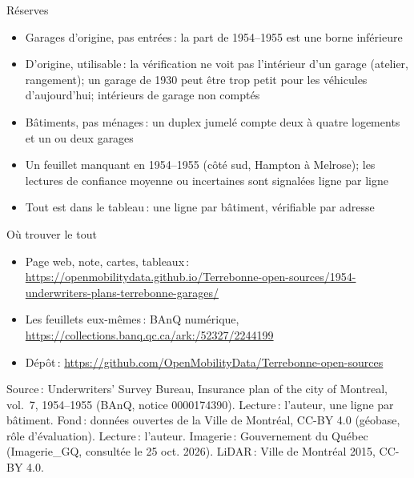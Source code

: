 \documentclass[aspectratio=169,11pt]{beamer}
\begin{document}
\begin{frame}{Réserves}\begin{itemize}\item Garages d'origine, pas entrées\,: la part de 1954--1955 est une borne inférieure
\item D'origine, utilisable\,: la vérification ne voit pas l'intérieur d'un garage (atelier, rangement); un garage de 1930 peut être trop petit pour les véhicules d'aujourd'hui; intérieurs de garage non comptés
\item Bâtiments, pas ménages\,: un duplex jumelé compte deux à quatre logements et un ou deux garages
\item Un feuillet manquant en 1954--1955 (côté sud, Hampton à Melrose); les lectures de confiance moyenne ou incertaines sont signalées ligne par ligne
\item Tout est dans le tableau\,: une ligne par bâtiment, vérifiable par adresse\end{itemize}\end{frame}
\begin{frame}{Où trouver le tout}\begin{itemize}\item Page web, note, cartes, tableaux\,: \url{https://openmobilitydata.github.io/Terrebonne-open-sources/1954-underwriters-plans-terrebonne-garages/}
\item Les feuillets eux-mêmes\,: BAnQ numérique, \url{https://collections.banq.qc.ca/ark:/52327/2244199}
\item Dépôt\,: \url{https://github.com/OpenMobilityData/Terrebonne-open-sources}\end{itemize}\vfill{\tiny Source\,: Underwriters' Survey Bureau, Insurance plan of the city of Montreal, vol.~7, 1954--1955 (BAnQ, notice 0000174390). Lecture\,: l'auteur, une ligne par bâtiment. Fond\,: données ouvertes de la Ville de Montréal, CC-BY 4.0 (géobase, rôle d'évaluation). Lecture\,: l'auteur. Imagerie\,: Gouvernement du Québec (Imagerie\_GQ, consultée le 25 oct. 2026). LiDAR\,: Ville de Montréal 2015, CC-BY 4.0.}\end{frame}
\end{document}
